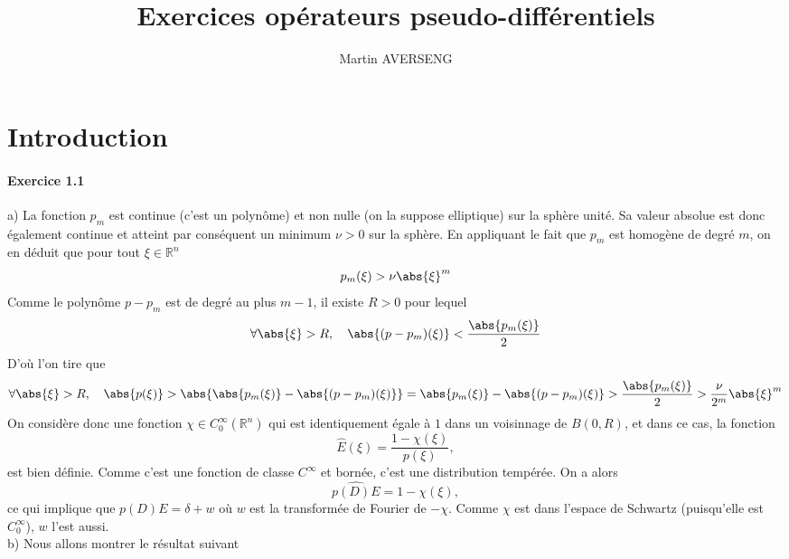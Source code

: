 \documentclass[11pt,a4paper]{article}
\author{Martin AVERSENG}
\title{Exercices opérateurs pseudo-différentiels}
\begin{document}
\maketitle

\section{Introduction}
\paragraph{Exercice 1.1}

a) La fonction $p_m$ est continue (c'est un polynôme) et non nulle (on la suppose elliptique) sur la sphère unité. Sa valeur absolue est donc également continue et atteint par conséquent un minimum $\nu >0$ sur la sphère. En appliquant le fait que $p_m$ est homogène de degré $m$, on en déduit que pour tout $\xi \in \mathbb{R}^n$
\[p_m(\xi) > \nu \abs{\xi}^m \]
Comme le polynôme $p - p_m$ est de degré au plus $m-1$, il existe $R > 0$ pour lequel 
\[ \forall \abs{\xi} > R, \quad \abs{(p - p_m)(\xi)} < \dfrac{\abs{p_m(\xi)}}{2}\]
D'où l'on tire que 
\[\forall \abs{\xi} > R,\quad \abs{p(\xi)} > \abs{ \abs{p_m(\xi)} - \abs{ (p-p_m)(\xi)}} = \abs{p_m(\xi)} - \abs{(p - p_m)(\xi)} > \dfrac{\abs{p_m(\xi)}}{2} > \dfrac{\nu}{2^m}\abs{\xi}^m\]
On considère donc une fonction $\chi \in C^{\infty}_0(\mathbb{R}^n)$ qui est identiquement égale à $1$ dans un voisinnage de $B(0,R)$, et dans ce cas, la fonction 
\[ \hat{E}(\xi) = \dfrac{1 - \chi(\xi)}{p(\xi)},\]
est bien définie. Comme c'est une fonction de classe $C^\infty$ et bornée, c'est une distribution tempérée. 
On a alors 
\[ \widehat{p(D) E} = 1 - \chi(\xi),\]
ce qui implique que $p(D)E = \delta + w$ où $w$ est la transformée de Fourier de $-\chi$. Comme $\chi$ est dans l'espace de Schwartz (puisqu'elle est $C^{\infty}_0$), $w$ l'est aussi. \newline 
\\
b) Nous allons montrer le résultat suivant 
\end{document}
